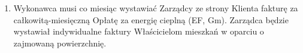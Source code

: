 \begin{enumerate}

\begin{center}
\begin{tabu}{|X|X|X|X|X|X|} \tabucline{}
{{with translate "pl" .Contract.Tables.calc_energy_fee}} %
	{{.Columns | column}} \\\tabucline{}
	{{range .Headers}} {{.|row}} \\\tabucline{} {{end}} %
	{{range .Rows}} {{.|row}} \\\tabucline{} {{end}} %
	\bfseries {{total .}} \\\tabucline{} %
{{end}}
\end{tabu}
\end{center}

	\item Wykonawca musi co miesiąc wystawiać Zarządcy ze strony Klienta fakturę za całkowitą{-}miesięczną Opłatę za energię cieplną (EF, Gm). Zarządca będzie wystawiał indywidualne faktury Właścicielom mieszkań w oparciu o zajmowaną powierzchnię.
\end{enumerate}

